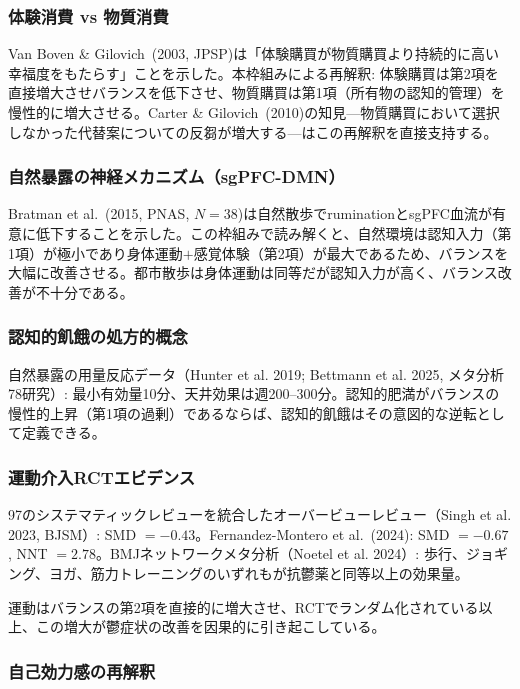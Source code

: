 \documentclass[a4paper,11pt,titlepage]{article}
\begin{document}
\subsubsection{体験消費 vs 物質消費}

Van Boven \& Gilovich~(2003, JPSP)は「体験購買が物質購買より持続的に高い幸福度をもたらす」ことを示した。本枠組みによる再解釈: 体験購買は第2項を直接増大させバランスを低下させ、物質購買は第1項（所有物の認知的管理）を慢性的に増大させる。Carter \& Gilovich~(2010)の知見---物質購買において選択しなかった代替案についての反芻が増大する---はこの再解釈を直接支持する。

\subsubsection{自然暴露の神経メカニズム（sgPFC-DMN）}

Bratman et al.~(2015, PNAS, $N=38$)は自然散歩でruminationとsgPFC血流が有意に低下することを示した。この枠組みで読み解くと、自然環境は認知入力（第1項）が極小であり身体運動$+$感覚体験（第2項）が最大であるため、バランスを大幅に改善させる。都市散歩は身体運動は同等だが認知入力が高く、バランス改善が不十分である。

\subsubsection{認知的飢餓の処方的概念}

自然暴露の用量反応データ（Hunter et al. 2019; Bettmann et al. 2025, メタ分析78研究）: 最小有効量10分、天井効果は週200--300分。認知的肥満がバランスの慢性的上昇（第1項の過剰）であるならば、認知的飢餓はその意図的な逆転として定義できる。

\subsubsection{運動介入RCTエビデンス}

97のシステマティックレビューを統合したオーバービューレビュー（Singh et al. 2023, BJSM）: SMD $= -0.43$。Fernandez-Montero et al.~(2024): SMD $= -0.67$, NNT $= 2.78$。BMJネットワークメタ分析（Noetel et al. 2024）: 歩行、ジョギング、ヨガ、筋力トレーニングのいずれもが抗鬱薬と同等以上の効果量。

運動はバランスの第2項を直接的に増大させ、RCTでランダム化されている以上、この増大が鬱症状の改善を因果的に引き起こしている。

\subsubsection{自己効力感の再解釈}
\end{document}
